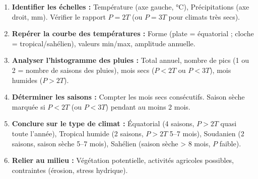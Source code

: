 \documentclass[11pt]{article}
\begin{document}
\begin{methode}
\begin{enumerate}
    \item \textbf{Identifier les échelles :} Température (axe gauche, \si{\celsius}), Précipitations (axe droit, \si{mm}). Vérifier le rapport $P = 2T$ (ou $P = 3T$ pour climats très secs).
    \item \textbf{Repérer la courbe des températures :} Forme (plate = équatorial ; cloche = tropical/sahélien), valeurs min/max, amplitude annuelle.
    \item \textbf{Analyser l'histogramme des pluies :} Total annuel, nombre de pics (1 ou 2 = nombre de saisons des pluies), mois secs ($P < 2T$ ou $P < 3T$), mois humides ($P > 2T$).
    \item \textbf{Déterminer les saisons :} Compter les mois secs consécutifs. Saison sèche marquée si $P < 2T$ (ou $P < 3T$) pendant au moins 2 mois.
    \item \textbf{Conclure sur le type de climat :} Équatorial (4 saisons, $P > 2T$ quasi toute l'année), Tropical humide (2 saisons, $P > 2T$ 5--7 mois), Soudanien (2 saisons, saison sèche 5--7 mois), Sahélien (saison sèche > 8 mois, $P$ faible).
    \item \textbf{Relier au milieu :} Végétation potentielle, activités agricoles possibles, contraintes (érosion, stress hydrique).
\end{enumerate}
\end{methode}
\end{document}
